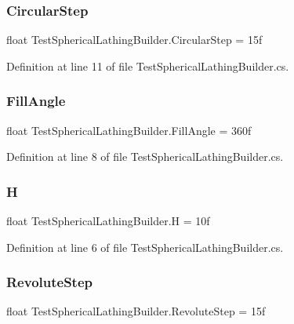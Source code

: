 \subsubsection{\texorpdfstring{CircularStep}{CircularStep}}
{\footnotesize\ttfamily float Test\+Spherical\+Lathing\+Builder.\+Circular\+Step = 15f}



Definition at line 11 of file Test\+Spherical\+Lathing\+Builder.\+cs.

\mbox{\label{class_test_spherical_lathing_builder_a977f0ccf34432c1ab9c21b909ed9f3c9}} 
\subsubsection{\texorpdfstring{FillAngle}{FillAngle}}
{\footnotesize\ttfamily float Test\+Spherical\+Lathing\+Builder.\+Fill\+Angle = 360f}



Definition at line 8 of file Test\+Spherical\+Lathing\+Builder.\+cs.

\mbox{\label{class_test_spherical_lathing_builder_a6553ab885937fc1376be0d8e0e495d97}} 
\subsubsection{\texorpdfstring{H}{H}}
{\footnotesize\ttfamily float Test\+Spherical\+Lathing\+Builder.\+H = 10f}



Definition at line 6 of file Test\+Spherical\+Lathing\+Builder.\+cs.

\mbox{\label{class_test_spherical_lathing_builder_a7a9ebb9b908c19519ccab9c82afa18d0}} 
\subsubsection{\texorpdfstring{RevoluteStep}{RevoluteStep}}
{\footnotesize\ttfamily float Test\+Spherical\+Lathing\+Builder.\+Revolute\+Step = 15f}



